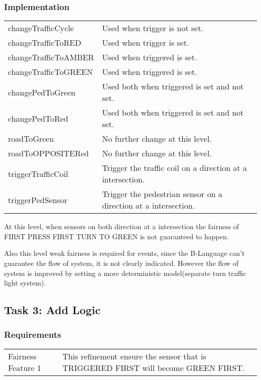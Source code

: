 \documentclass[a4paper]{article}
\begin{document}
\subsubsection{Implementation}
\begin{center}
\begin{tabular}{|p{3.6cm}|p{10cm}|}
\hline
\color{blue}{Event} & \color{blue}{Usage}\\
\hline
  changeTrafficCycle & Used when trigger is not set.\\
  \hline
  changeTrafficToRED & Used when trigger is set.\\
  \hline
  changeTrafficToAMBER & Used when triggered is set.\\
  \hline
  changeTrafficToGREEN & Used when triggered is set.\\
  \hline
  changePedToGreen & Used both when triggered is set and not set.\\
  \hline
  changePedToRed & Used both when triggered is set and not set.\\
  \hline
  roadToGreen & No further change at this level.\\
  \hline
  roadToOPPOSITERed & No further change at this level.\\
  \hline
  triggerTrafficCoil & Trigger the traffic coil on a direction at a intersection.\\
  \hline
  triggerPedSensor & Trigger the pedestrian sensor on a direction at a intersection.\\
\hline
\end{tabular}
\end{center}
\indent\indent At this level, when sensors on both direction at a intersection the fairness of FIRST PRESS FIRST TURN TO GREEN is not guaranteed to happen.

Also this level weak fairness is required for events, since the B-Language can't guarantee the flow of system, it is not clearly indicated. However the flow of system is improved by setting a more deterministic model(separate turn traffic light system).

\newpage

\subsection{Task 3: Add Logic}
\subsubsection{Requirements}
\begin{center}
\begin{tabular}{|p{3.5cm}|p{10cm}|}
\hline
\color{blue}{Requirements} & \color{blue}{Function}\\
\hline
  Fairness Feature 1 & This refinement ensure the sensor that is TRIGGERED FIRST will become GREEN FIRST.\\
  \hline
\end{tabular}
\end{center}
\end{document}
